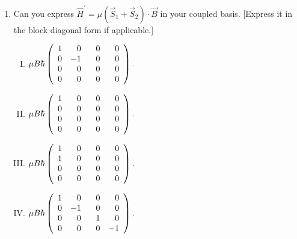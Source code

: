 \documentclass[12pt]{article}
\begin{document}
\begin{enumerate}[1.]
\begin{enumerate}[a)]
    \end{enumerate}
\item Can you express $\hat{H}^{'} = \mu \left ( \vec{S}_1 + \vec{S}_2 \right ) \cdot \vec{B}$ in your coupled basis. [Express it in the block diagonal form if applicable.] \newline
        [Hint: Assume $\vec{B} = B \hat{k}$.]
        \begin{enumerate}[I.]
              \item $\mu B \hbar \left( \begin{array}{crrr}
              1 & 0 & 0 & 0 \\
              0 & -1 & \hphantom{-}0 & \hphantom{-}0 \\
              0 & 0 & 0 & 0 \\
              0 & 0 & 0 & 0 \\
              \end{array} \right). $
              \item $\mu B \hbar \left( \begin{array}{crrr}
              1 & 0 & 0 & 0 \\
              0 & \hphantom{-}0 & \hphantom{-}0 & \hphantom{-}0 \\
              0 & 0 & 0 & 0 \\
              0 & 0 & 0 & 0 \\
              \end{array} \right). $
              \item $\mu B \hbar \left( \begin{array}{crrr}
              1 & 0 & 0 & 0 \\
              1 & \hphantom{-}0 & \hphantom{-}0 & \hphantom{-}0 \\
              0 & 0 & 0 & 0 \\
              0 & 0 & 0 & 0 \\
              \end{array} \right). $
              \item $\mu B \hbar \left( \begin{array}{crrr}
              1 & 0 & 0 & 0 \\
              0 & -1 & \hphantom{-}0 & \hphantom{-}0 \\
              0 & 0 & 1 & 0 \\
              0 & 0 & 0 & -1 \\
              \end{array} \right). $ \\ \newline

\end{enumerate}
\end{enumerate}
\end{document}
